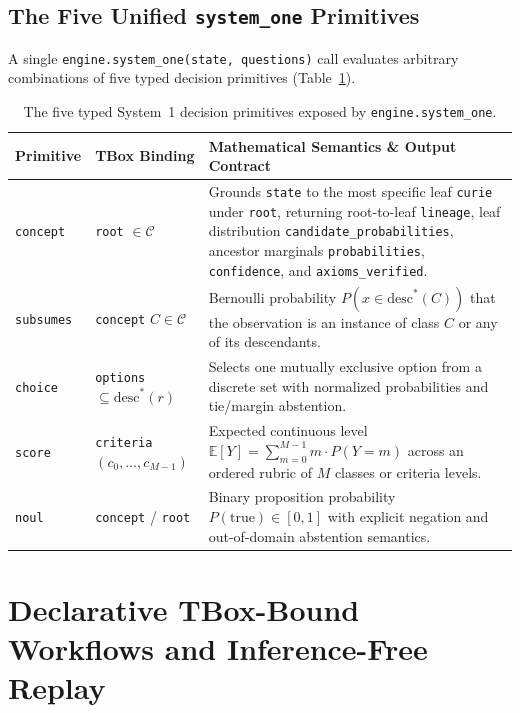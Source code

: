 \documentclass[11pt,a4paper]{article}
\begin{document}
\subsection{The Five Unified \texttt{system\_one} Primitives}

A single \texttt{engine.system\_one(state, questions)} call evaluates arbitrary combinations of five typed decision primitives (Table~\ref{tab:primitives}).

\begin{table}[ht!]
\centering
\caption{The five typed System~1 decision primitives exposed by \texttt{engine.system\_one}.}
\label{tab:primitives}
\vspace{0.4em}
\small
\begin{tabularx}{\textwidth}{l l X}
\toprule
\textbf{Primitive} & \textbf{TBox Binding} & \textbf{Mathematical Semantics \& Output Contract} \\
\midrule
\texttt{concept} & \texttt{root} $\in \mathcal{C}$ & Grounds \texttt{state} to the most specific leaf \texttt{curie} under \texttt{root}, returning root-to-leaf \texttt{lineage}, leaf distribution \texttt{candidate\_probabilities}, ancestor marginals \texttt{probabilities}, \texttt{confidence}, and \texttt{axioms\_verified}. \\
\addlinespace[0.25em]
\texttt{subsumes} & \texttt{concept} $C \in \mathcal{C}$ & Bernoulli probability $P(x \in \mathrm{desc}^*(C))$ that the observation is an instance of class $C$ or any of its descendants. \\
\addlinespace[0.25em]
\texttt{choice} & \texttt{options} $\subseteq \mathrm{desc}^*(r)$ & Selects one mutually exclusive option from a discrete set with normalized probabilities and tie/margin abstention. \\
\addlinespace[0.25em]
\texttt{score} & \texttt{criteria} $(c_0, \dots, c_{M-1})$ & Expected continuous level $\mathbb{E}[Y] = \sum_{m=0}^{M-1} m \cdot P(Y = m)$ across an ordered rubric of $M$ classes or criteria levels. \\
\addlinespace[0.25em]
\texttt{noul} & \texttt{concept} / \texttt{root} & Binary proposition probability $P(\text{true}) \in [0, 1]$ with explicit negation and out-of-domain abstention semantics. \\
\bottomrule
\end{tabularx}
\end{table}

\section{Declarative TBox-Bound Workflows and Inference-Free Replay}
\label{sec:workflows}
\end{document}
